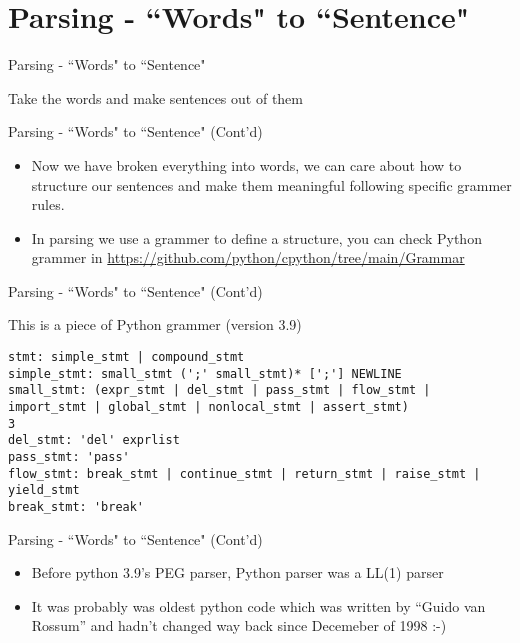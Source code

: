 \section{Parsing - ``Words" to ``Sentence"}
\begin{frame}{Parsing - ``Words" to ``Sentence"}
\begin{itemize}
{\LARGE \item[-] Take the words and make sentences out of them}
\end{itemize}
\end{frame}

\begin{frame}{Parsing - ``Words" to ``Sentence" (Cont'd)}
\begin{itemize}
\item[-]<1-> Now we have broken everything into words, we can care about how to structure our sentences
and make them meaningful following specific grammer rules. 

\item[-]<2->
In parsing we use a grammer
to define a structure, you can check Python grammer in \url{https://github.com/python/cpython/tree/main/Grammar}
\end{itemize}
\end{frame}

\begin{frame}[fragile]{Parsing - ``Words" to ``Sentence" (Cont'd)}
\begin{flushleft}
This is a piece of Python grammer (version 3.9)
\begin{lstlisting}[numbers=none]
stmt: simple_stmt | compound_stmt
simple_stmt: small_stmt (';' small_stmt)* [';'] NEWLINE
small_stmt: (expr_stmt | del_stmt | pass_stmt | flow_stmt |
import_stmt | global_stmt | nonlocal_stmt | assert_stmt)
3
del_stmt: 'del' exprlist
pass_stmt: 'pass'
flow_stmt: break_stmt | continue_stmt | return_stmt | raise_stmt |
yield_stmt
break_stmt: 'break'
\end{lstlisting}
\end{flushleft}
\end{frame}

\begin{frame}{Parsing - ``Words" to ``Sentence" (Cont'd)}
\begin{itemize}
\item[-]<1> Before python 3.9’s PEG parser, Python parser was a LL(1) parser

\item[-]<2> It was probably was oldest python code which was written by “Guido van Rossum” and hadn’t changed way back since
Decemeber of 1998 :-)
\end{itemize}
\end{frame}